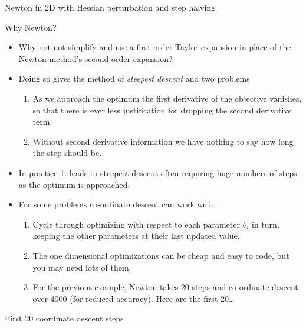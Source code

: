 \documentclass{beamer}
\begin{document}
\begin{frame}{Newton in 2D with Hessian perturbation and step halving}
\begin{center}
\end{center}
\end{frame}

\begin{frame}{Why Newton?}
\begin{itemize}
\item Why not not simplify and use a first order Taylor expansion in place of the Newton method's second order expansion?
\item Doing so gives the method of {\em steepest descent} and two problems
\begin{enumerate}
\item As we approach the optimum the first derivative of the objective vanishes, so that there is ever less justification for dropping the second derivative term.
\item Without second derivative information we have nothing to say how long the step should be.
\end{enumerate}
\item In practice 1. leads to steepest descent often requiring huge numbers of steps as the optimum is approached.
\item For some problems co-ordinate descent can work well.
\begin{enumerate}
\item Cycle through optimizing with respect to each parameter $\theta_i$ in turn, keeping the other parameters at their last updated value.
\item The one dimensional optimizations can be cheap and easy to code, but you may need lots of them.   
\item For the previous example, Newton takes 20 steps and co-ordinate descent over 4000 (for reduced accuracy). Here are the first 20\ldots
\end{enumerate}
\end{itemize}
\end{frame}

\begin{frame}{First 20 coordinate descent steps}
\begin{center}
\end{center}
\end{frame}
\end{document}
